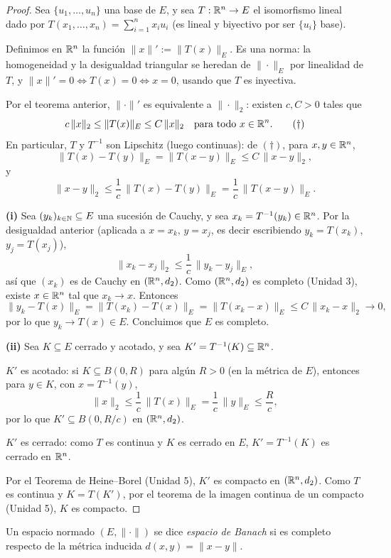 \begin{proof}
Sea $\{u_1,\dots,u_n\}$ una base de $E$, y sea $T:\mathbb{R}^n\to E$ el
isomorfismo lineal dado por $T(x_1,\dots,x_n) = \sum_{i=1}^n x_i u_i$
(es lineal y biyectivo por ser $\{u_i\}$ base).

Definimos en $\mathbb{R}^n$ la función $\|x\|' := \|T(x)\|_E$. Es una norma: la
homogeneidad y la desigualdad triangular se heredan de $\|\cdot\|_E$
por linealidad de $T$, y $\|x\|'=0 \iff T(x)=0 \iff x=0$, usando que
$T$ es inyectiva.

Por el teorema anterior, $\|\cdot\|'$ es equivalente a $\|\cdot\|_2$:
existen $c,C>0$ tales que
\[
c\,\|x\|_2 \le \|T(x)\|_E \le C\,\|x\|_2 \quad \text{para todo }
x\in\mathbb{R}^n. \tag{$\dagger$}
\]
En particular, $T$ y $T^{-1}$ son Lipschitz (luego continuas): de
$(\dagger)$, para $x,y\in\mathbb{R}^n$,
\[
\|T(x)-T(y)\|_E = \|T(x-y)\|_E \le C\,\|x-y\|_2,
\]
y
\[
\|x-y\|_2 \le \frac{1}{c}\,\|T(x)-T(y)\|_E = \frac1c\, \|T(x-y)\|_E.
\]

\textbf{(i)} Sea $(y_k)_{k\in\mathbb{N}}\subseteq E$ una sucesión de Cauchy, y
sea $x_k=T^{-1}(y_k)\in\mathbb{R}^n$. Por la desigualdad anterior (aplicada a
$x=x_k,\,y=x_j$, es decir escribiendo $y_k=T(x_k)$, $y_j=T(x_j)$),
\[
\|x_k-x_j\|_2 \le \frac1c\, \|y_k-y_j\|_E,
\]
así que $(x_k)$ es de Cauchy en $(\mathbb{R}^n,d_2)$. Como $(\mathbb{R}^n,d_2)$ es
completo (Unidad 3), existe $x\in\mathbb{R}^n$ tal que $x_k\to x$. Entonces
\[
\|y_k - T(x)\|_E = \|T(x_k)-T(x)\|_E = \|T(x_k-x)\|_E \le C\,\|x_k-x\|_2
\to 0,
\]
por lo que $y_k \to T(x) \in E$. Concluimos que $E$ es completo.

\textbf{(ii)} Sea $K\subseteq E$ cerrado y acotado, y sea $K' =
T^{-1}(K) \subseteq \mathbb{R}^n$.

$K'$ es acotado: si $K\subseteq B(0,R)$ para algún $R>0$ (en la métrica
de $E$), entonces para $y\in K$, con $x=T^{-1}(y)$,
\[
\|x\|_2 \le \frac1c\, \|T(x)\|_E = \frac1c\, \|y\|_E \le \frac{R}{c},
\]
por lo que $K' \subseteq B(0,R/c)$ en $(\mathbb{R}^n,d_2)$.

$K'$ es cerrado: como $T$ es continua y $K$ es cerrado en $E$,
$K'=T^{-1}(K)$ es cerrado en $\mathbb{R}^n$.

Por el Teorema de Heine--Borel (Unidad 5), $K'$ es compacto en
$(\mathbb{R}^n,d_2)$. Como $T$ es continua y $K=T(K')$, por el teorema de la
imagen continua de un compacto (Unidad 5), $K$ es compacto.
\end{proof}

\begin{defi}
Un espacio normado $(E,\|\cdot\|)$ se dice \emph{espacio de Banach} si
es completo respecto de la métrica inducida $d(x,y)=\|x-y\|$.
\end{defi}

